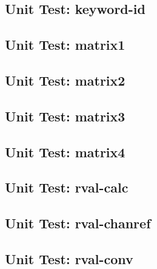 \subsection*{Unit Test: keyword-id}

 \clearpage
\subsection*{Unit Test: matrix1}

 \clearpage
\subsection*{Unit Test: matrix2}

 \clearpage
\subsection*{Unit Test: matrix3}

 \clearpage
\subsection*{Unit Test: matrix4}

 \clearpage
\subsection*{Unit Test: rval-calc}

 \clearpage
\subsection*{Unit Test: rval-chanref}

 \clearpage
\subsection*{Unit Test: rval-conv}

 \clearpage
